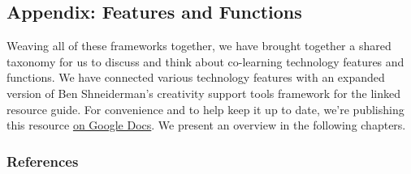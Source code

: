 \hypertarget{appendix-features-and-functions}{%
\subsection{Appendix: Features and
Functions}\label{appendix-features-and-functions}}

Weaving all of these frameworks together, we have brought together a
shared taxonomy for us to discuss and think about co-learning technology
features and functions. We have connected various technology features
with an expanded version of Ben Shneiderman's creativity support tools
framework for the linked resource guide. For convenience and to help
keep it up to date, we're publishing this resource
\href{http://goo.gl/H02fMA}{on Google Docs}. We present an overview in
the following chapters.

\hypertarget{references}{%
\subsubsection{References}\label{references}}

